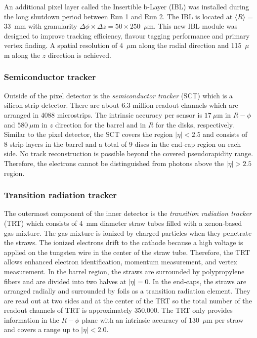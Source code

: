An additional pixel layer called the Insertible b-Layer (IBL) was installed during the long shutdown period between Run 1 and Run 2.
The IBL is located at $\langle R \rangle$ = 33~mm with granularity $\Delta \phi \times \Delta z = 50 \times 250$~$\mu$m.
This new IBL module was designed to improve tracking efficiency, flavour tagging performance and primary vertex finding.
A spatial resolution of 4~$\mu$m along the radial direction and 115~$\mu$m along the $z$ direction is achieved.


\subsubsection{Semiconductor tracker}
\label{subsubsec:ae_sct}
Outside of the pixel detector is the \textit{semiconductor tracker} (SCT) which is a silicon strip detector.
There are about 6.3 million readout channels which are arranged in 4088 microstrips.
The intrinsic accuracy per sensor is $17~\mu$m in $R-\phi$ and $580~\mu$m in $z$ direction for the barrel and in $R$ for the  disks, respectively.
Similar to the pixel detector, the SCT covers the region $|\eta| < 2.5$ and consists of 8 strip layers in the barrel and a total of 9 discs in the end-cap region on each side.
No track reconstruction is possible beyond the covered pseudorapidity range.
Therefore, the electrons cannot be distinguished from photons above the $|\eta| > 2.5$ region.


\subsubsection{Transition radiation tracker}
\label{subsubsec:ae_trt}
The outermost component of the inner detector is the \textit{transition radiation tracker} (TRT) which consists of 4~mm diameter straw tubes filled with a xenon-based gas mixture.
The gas mixture is ionized by charged particles when they penetrate the straws.
The ionized electrons drift to the cathode because a high voltage is applied on the tungsten wire in the center of the straw tube.
Therefore, the TRT allows enhanced electron identification, momentum measurement, and vertex measurement.
In the barrel region, the straws are surrounded by polypropylene fibers and are divided into two halves at $|\eta|=0$.
In the end-caps, the straws are arranged radially and surrounded by foils as a transition radiation element.
They are read out at two sides and at the center of the TRT so the total number of the readout channels of TRT is approximately 350,000.
The TRT only provides information in the $R-\phi$ plane with an intrinsic accuracy of 130~$\mu$m per straw and covers a range up to $|\eta| < 2.0$. 

